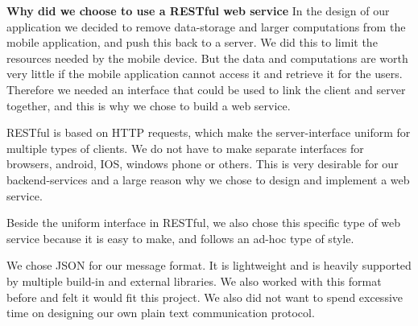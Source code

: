 \textbf{Why did we choose to use a RESTful web service}
In the design of our application we decided to remove data-storage and larger computations from the mobile application, and push this back to a server. We did this to limit the resources needed by the mobile device. But the data and computations are worth very little if the mobile application cannot access it and retrieve it for the users. Therefore we needed an interface that could be used to link the client and server together, and this is why we chose to build a web service.

RESTful is based on HTTP requests, which make the server-interface uniform for multiple types of clients. We do not have to make separate interfaces for browsers, android, IOS, windows phone or others. This is very desirable for our backend-services and a large reason why we chose to design and implement a web service. 

Beside the uniform interface in RESTful, we also chose this specific type of web service because it is easy to make, and follows an ad-hoc type of style\cite{DecidingOnRESTful}. 

We chose JSON for our message format. It is lightweight and is heavily supported by multiple build-in and external libraries. We also worked with this format before and felt it would fit this project. We also did not want to spend excessive time on designing our own plain text communication protocol.



